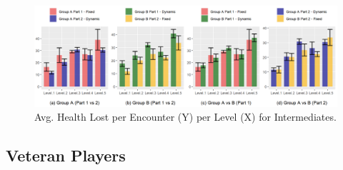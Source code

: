 \begin{figure}[!ht]
    \begin{center}
    \caption{Avg. Health Lost per Encounter (Y) per Level (X) for Intermediates.}
        \includegraphics[width=34em]{figures/health_lost_per_encounter-intermediate_players.png}
    \end{center}
    \label{fig:result-metric-intermediates-health-lost-per-encounter}
\end{figure}


\subsection{Veteran Players}



